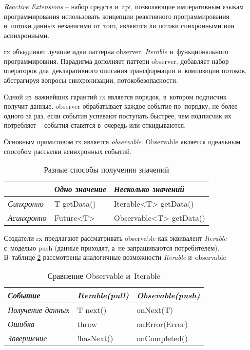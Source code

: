 \subsubsection{}
\label{sec:analysis:research:mobArch:rx}

\emph{Reactive Extensions} -- набор средств и~\gls{api}, позволяющие императивным языкам программирования использовать концепции реактивного программирования и~потоки данных независимо от~того, являются ли потоки синхронными или асинхронными\cite{wiki:rx}.

\gls{rx} объединяет лучшие идеи паттерна \gls{observer}, \textit{Iterable} и~функционального программировния. Парадигма дополняет паттерн \gls{observer}, добавляет набор операторов для~декларативного описания трансформации и~композиции потоков, абстрагируя вопросы синхронизации, потокобезопасности.

Одной из~важнейших гарантий \gls{rx} является порядок, в~котором подписчик получит данные. \gls{observer} обрабатывает каждое событие по~порядку, не более одного за раз, если события успевают поступать быстрее, чем подписчик их потребляет -- события ставятся в~очередь или откидываются.

Основным примитивом \gls{rx} является \emph{\gls{observable}}. Observable является идеальным способом рассылки асинхронных событий\cite{programming-in-haskell}.

\begin{table}[h!]
\caption{Разные способы получения значений}
\label{theory:archeticture:rx:call}
\centering
\begin{tabularx}{\textwidth}{ |X|X|X| } 
 \hline
  & \emph{Одно значение} & \emph{Несколько значений} \\ 
 \hline
 \emph{Синхронно} & T getData() & Iterable<T> getData() \\ 
 \hline
 \emph{Асинхронно} & Future<T> & Observable<T> getData() \\ 
 \hline
\end{tabularx}
\end{table}

Создатели \gls{rx} предлагают\cite{reactivex:introduction} рассматривать \gls{observable} как эквивалент \textit{Iterable} с~моделью push (данные приходят, а~не запрашиваются потребителем). В~таблице \ref{theory:archeticture:rx:iterable-observable} рассмотрены аналогичные возможности \textit{Iterable} и~\gls{observable}

\begin{table}[h!]
\caption{Сравнение Observable и~Iterable}
\label{theory:archeticture:rx:iterable-observable}
\centering
\begin{tabularx}{\textwidth}{ |X|X|X| } 
 \hline
 \emph{Событие} & \emph{Iterable(pull)} & \emph{Obsevable(push)} \\ 
 \hline
 \emph{Получение данных} & T next() & onNext(T) \\ 
 \hline
 \emph{Ошибка} & throw & onError(Error) \\ 
 \hline
  \emph{Завершение} & !hasNext() & onCompleted() \\ 
 \hline
\end{tabularx}
\end{table}

